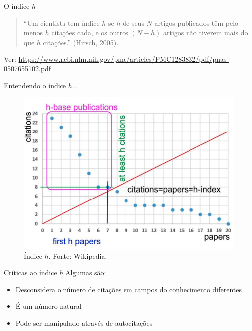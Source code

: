 \begin{frame}{O índice $h$}
\begin{quotation}
``Um cientista tem índice $h$ se $h$ de seus $N$ artigos publicados têm pelo menos $h$ citações cada, e os outros $(N-h)$ artigos não tiverem mais do que $h$ citações.'' (Hirsch, 2005).
\end{quotation}

Ver: \url{https://www.ncbi.nlm.nih.gov/pmc/articles/PMC1283832/pdf/pnas-0507655102.pdf}
\end{frame}

\begin{frame}{Entendendo o índice $h$...}
\begin{figure}
\centering
\includegraphics[scale=0.2]{figs/03/h-index}
\caption{Índice $h$. Fonte: Wikipedia.}
\end{figure}
\end{frame}

\begin{frame}{Críticas ao índice $h$}
Algumas são:
\begin{itemize}
\item Desconsidera o número de citações em campos do conhecimento diferentes
\item É um número natural
\item Pode ser manipulado através de autocitações
\end{itemize}
\end{frame}

